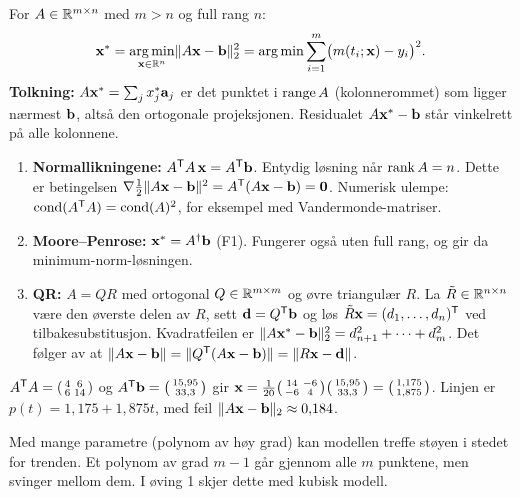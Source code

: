 \begin{defn}
For $A\in\mathbb{R}^{m\times n}$ med $m>n$ og full rang $n$:
\[
\mathbf{x}^*=\operatorname*{arg\,min}_{\mathbf{x}\in\mathbb{R}^n}\lVert A\mathbf{x}-\mathbf{b}\rVert_2^2=\operatorname*{arg\,min}\sum_{i=1}^m\bigl(m(t_i;\mathbf{x})-y_i\bigr)^2 .
\]
\textbf{Tolkning:} $A\mathbf{x}^*=\sum_jx_j^*\mathbf{a}_j$ er det punktet i $\operatorname{range} A$ (kolonnerommet) som ligger nærmest $\mathbf{b}$, altså den ortogonale projeksjonen. Residualet $A\mathbf{x}^*-\mathbf{b}$ står vinkelrett på alle kolonnene.
\end{defn}
\begin{teorem}
\begin{enumerate}
  \item \textbf{Normallikningene:} $A^{\mathsf{T}} A\,\mathbf{x}=A^{\mathsf{T}}\mathbf{b}$. Entydig løsning når $\operatorname{rank} A=n$. Dette er betingelsen $\nabla\frac12\lVert A\mathbf{x}-\mathbf{b}\rVert^2=A^{\mathsf{T}}(A\mathbf{x}-\mathbf{b})=\mathbf{0}$. Numerisk ulempe: $\operatorname{cond}(A^{\mathsf{T}} A)=\operatorname{cond}(A)^2$, for eksempel med Vandermonde-matriser.
  \item \textbf{Moore--Penrose:} $\mathbf{x}^*=A^\dagger\mathbf{b}$ (F1). Fungerer også uten full rang, og gir da minimum-norm-løsningen.
  \item \textbf{QR:} $A=QR$ med ortogonal $Q\in\mathbb{R}^{m\times m}$ og øvre triangulær $R$. La $\tilde R\in\mathbb{R}^{n\times n}$ være den øverste delen av $R$, sett $\mathbf{d}=Q^{\mathsf{T}}\mathbf{b}$ og løs $\tilde R\mathbf{x}=(d_1,\dots,d_n)^{\mathsf{T}}$ ved tilbakesubstitusjon. Kvadratfeilen er $\lVert A\mathbf{x}^*-\mathbf{b}\rVert_2^2=d_{n+1}^2+\dots+d_m^2$. Det følger av at $\lVert A\mathbf{x}-\mathbf{b}\rVert=\lVert Q^{\mathsf{T}}(A\mathbf{x}-\mathbf{b})\rVert=\lVert R\mathbf{x}-\mathbf{d}\rVert$.
\end{enumerate}
\end{teorem}
\begin{eksempel}
$A^{\mathsf{T}} A=\begin{psmallmatrix}4&6\\6&14\end{psmallmatrix}$ og $A^{\mathsf{T}}\mathbf{b}=\begin{psmallmatrix}15{,}95\\33{,}3\end{psmallmatrix}$ gir
$\mathbf{x}=\frac1{20}\begin{psmallmatrix}14&-6\\-6&4\end{psmallmatrix}\begin{psmallmatrix}15{,}95\\33{,}3\end{psmallmatrix}=\begin{psmallmatrix}1{,}175\\1{,}875\end{psmallmatrix}$. Linjen er $p(t)=1{,}175+1{,}875t$, med feil $\lVert A\mathbf{x}-\mathbf{b}\rVert_2\approx0{,}184$.
\end{eksempel}
\begin{fallgruve}[overtilpasning]
Med mange parametre (polynom av høy grad) kan modellen treffe støyen i stedet for trenden. Et polynom av grad $m-1$ går gjennom alle $m$ punktene, men svinger mellom dem. I øving 1 skjer dette med kubisk modell.
\end{fallgruve}

